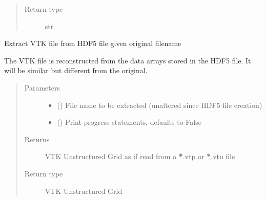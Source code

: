 \documentclass[letterpaper,10pt,english]{sphinxmanual}
\begin{document}
\begin{fulllineitems}
\begin{fulllineitems}
\begin{quote}
\begin{description}
\item[{Return type}] \leavevmode
str

\end{description}\end{quote}

\end{fulllineitems}


\begin{fulllineitems}
\label{\detokenize{openfdem:openfdem.aggregate_storage.aggregate_storage.read_file}}
Extract VTK file from HDF5 file given original filename

The VTK file is reconstructed from the data arrays stored in the HDF5 file. It will be similar but different from the original.
\begin{quote}\begin{description}
\item[{Parameters}] \leavevmode\begin{itemize}
\item {} 
 () \textendash{} File name to be extracted (unaltered since HDF5 file creation)

\item {} 
 (\sphinxstyleliteralemphasis{\sphinxupquote{, }}) \textendash{} Print progress statements, defaults to False

\end{itemize}

\item[{Returns}] \leavevmode
VTK Unstructured Grid as if read from a {\color{red}\bfseries{}*}.vtp or {\color{red}\bfseries{}*}.vtu file

\item[{Return type}] \leavevmode
VTK Unstructured Grid

\end{description}\end{quote}

\end{fulllineitems}


\end{fulllineitems}
\end{document}
